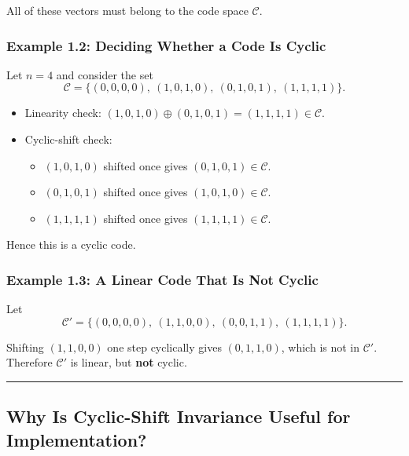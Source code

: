 \documentclass[
]{article}
\providecommand{\tightlist}{%
  \setlength{\itemsep}{0pt}\setlength{\parskip}{0pt}}
\begin{document}
All of these vectors must belong to the code space \(\mathcal{C}\).

\subsubsection{Example 1.2: Deciding Whether a Code Is
Cyclic}\label{example-1.2-deciding-whether-a-code-is-cyclic}

Let \(n=4\) and consider the set
\[\mathcal{C} = \{(0,0,0,0),\ (1,0,1,0),\ (0,1,0,1),\ (1,1,1,1)\}.\]

\begin{itemize}
\tightlist
\item
  Linearity check:
  \((1,0,1,0) \oplus (0,1,0,1) = (1,1,1,1) \in \mathcal{C}\).
\item
  Cyclic-shift check:

  \begin{itemize}
  \tightlist
  \item
    \((1,0,1,0)\) shifted once gives \((0,1,0,1) \in \mathcal{C}\).
  \item
    \((0,1,0,1)\) shifted once gives \((1,0,1,0) \in \mathcal{C}\).
  \item
    \((1,1,1,1)\) shifted once gives \((1,1,1,1) \in \mathcal{C}\).
  \end{itemize}
\end{itemize}

Hence this is a cyclic code.

\subsubsection{Example 1.3: A Linear Code That Is Not
Cyclic}\label{example-1.3-a-linear-code-that-is-not-cyclic}

Let
\[\mathcal{C}' = \{(0,0,0,0),\ (1,1,0,0),\ (0,0,1,1),\ (1,1,1,1)\}.\]

Shifting \((1,1,0,0)\) one step cyclically gives \((0,1,1,0)\), which is
not in \(\mathcal{C}'\). Therefore \(\mathcal{C}'\) is linear, but
\textbf{not} cyclic.

\begin{center}\rule{0.5\linewidth}{0.5pt}\end{center}

\subsection{Why Is Cyclic-Shift Invariance Useful for
Implementation?}\label{why-is-cyclic-shift-invariance-useful-for-implementation}
\end{document}
